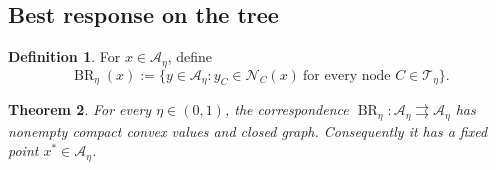 \documentclass[12pt]{article}
\newtheorem{theorem}{Theorem}[section]
\theoremstyle{definition}
\newtheorem{definition}[theorem]{Definition}
\newcommand{\1}{\mathbf{1}}
\newcommand{\cA}{\mathcal{A}}
\newcommand{\cN}{\mathcal{N}}
\newcommand{\cT}{\mathcal{T}}
\begin{document}
\subsection{Best response on the tree}

\begin{definition}
For \(x\in \cA_\eta\), define
\[
\operatorname{BR}_\eta(x)
:=
\bigl\{
y\in \cA_\eta : y_C\in \cN_C(x)\ \text{for every node }C\in \cT_\eta
\bigr\}.
\]
\end{definition}

\begin{theorem}
\label{thm:Kakutani}
For every \(\eta\in(0,1)\), the correspondence
\(\operatorname{BR}_\eta:\cA_\eta\rightrightarrows \cA_\eta\) has nonempty compact convex
values and closed graph.  Consequently it has a fixed point \(x^*\in \cA_\eta\).
\end{theorem}
\end{document}
